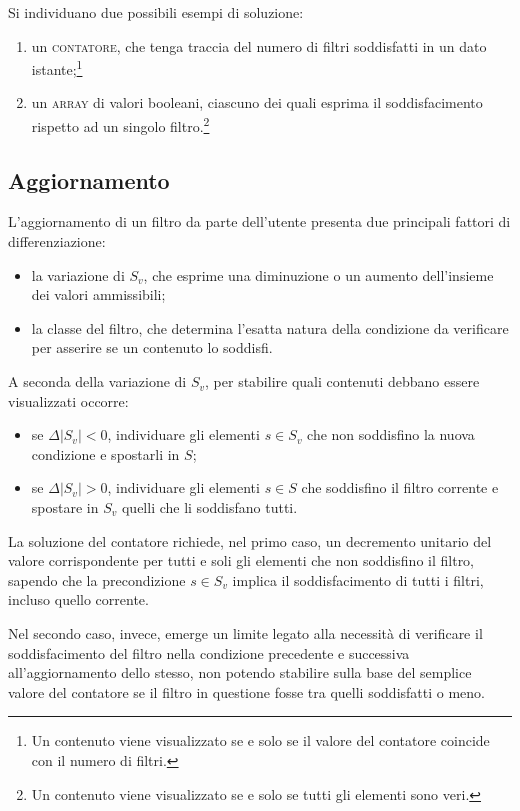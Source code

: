 Si individuano due possibili esempi di soluzione: 
\begin{enumerate}
  \item un \textsc{contatore}, che tenga traccia del numero di filtri soddisfatti in un dato istante;\footnote{Un contenuto viene visualizzato se e solo se il valore del contatore coincide con il numero di filtri.}
  \item un \textsc{array} di valori booleani, ciascuno dei quali esprima il soddisfacimento rispetto ad un singolo filtro.\footnote{Un contenuto viene visualizzato se e solo se tutti gli elementi sono veri.}
\end{enumerate}

\subsection{Aggiornamento}
L'aggiornamento di un filtro da parte dell'utente presenta due principali fattori di differenziazione:
\begin{itemize}
\item la variazione di $S_v$, che esprime una diminuzione o un aumento dell'insieme dei valori ammissibili;
\item la classe del filtro, che determina l'esatta natura della condizione da verificare per asserire se un contenuto lo soddisfi.
\end{itemize}

A seconda della variazione di $S_v$, per stabilire quali contenuti debbano essere visualizzati occorre:
\begin{itemize}
  \item se $\Delta \left|S_v\right|<0$, individuare gli elementi $s \in S_v$ che non soddisfino la nuova condizione e spostarli in $S$;
  \item se $\Delta \left|S_v\right|>0$, individuare gli elementi $s \in S$ che soddisfino il filtro corrente e spostare in $S_v$ quelli che li soddisfano tutti.
\end{itemize}

La soluzione del contatore richiede, nel primo caso, un decremento unitario del valore corrispondente per tutti e soli gli elementi che non soddisfino il filtro, sapendo che la precondizione $s \in S_v$ implica il soddisfacimento di tutti i filtri, incluso quello corrente.

Nel secondo caso, invece, emerge un limite legato alla necessità di verificare il soddisfacimento del filtro nella condizione precedente e successiva all'aggiornamento dello stesso, non potendo stabilire sulla base del semplice valore del contatore se il filtro in questione fosse tra quelli soddisfatti o meno.

